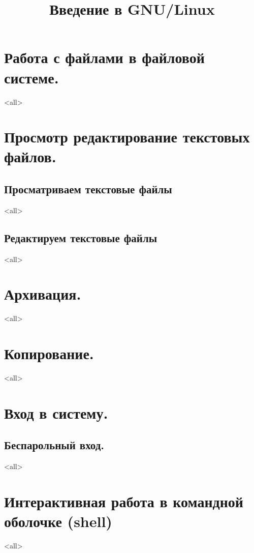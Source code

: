 

\title{Введение в GNU/Linux}




\begin{frame}
	\frametitle{}
	\titlepage
	\vspace{-0.5cm}
	\begin{center}
	\end{center}
\end{frame}


\begin{frame}
	\tableofcontents
	[hideallsubsections]
\end{frame}


\section{Работа с файлами в файловой системе.}
\mode<all>{}
\section{Просмотр редактирование текстовых файлов.}
\subsection{Просматриваем текстовые файлы}
\mode<all>{}
\subsection{Редактируем текстовые файлы}
\mode<all>{}
\section{Архивация.}
\mode<all>{}
\section{Копирование.}
\mode<all>{}
\section{Вход в систему.}
\subsection{Беспарольный вход.}
\mode<all>{}
\section{Интерактивная работа в командной оболочке (shell)}
\mode<all>{}

\bye
